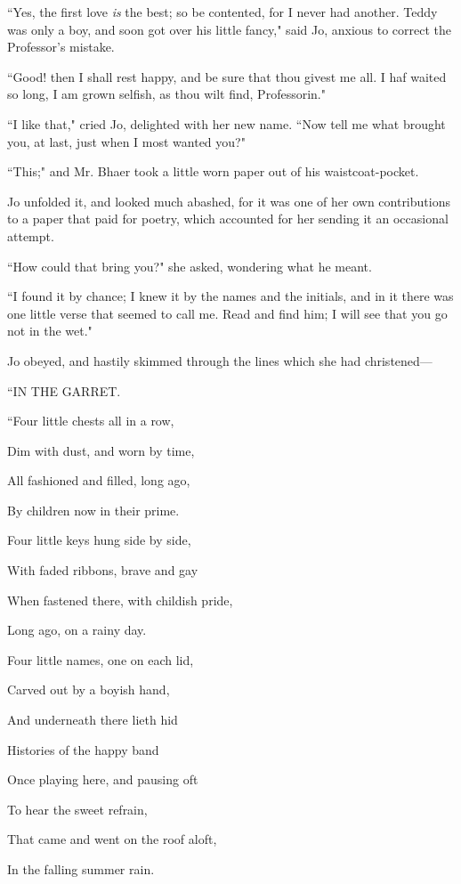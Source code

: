 ``Yes, the first love \emph{is} the best; so be contented, for I never
had another. Teddy was only a boy, and soon got over his little fancy,"
said Jo, anxious to correct the Professor's mistake.

``Good! then I shall rest happy, and be sure that thou givest me all. I
haf waited so long, I am grown selfish, as thou wilt find, Professorin."

``I like that," cried Jo, delighted with her new name. ``Now tell me what
brought you, at last, just when I most wanted you?"

``This;" and Mr. Bhaer took a little worn paper out of his
waistcoat-pocket.

Jo unfolded it, and looked much abashed, for it was one of her own
contributions to a paper that paid for poetry, which accounted for her
sending it an occasional attempt.

``How could that bring you?" she asked, wondering what he meant.

``I found it by chance; I knew it by the names and the initials, and in
it there was one little verse that seemed to call me. Read and find him;
I will see that you go not in the wet."

Jo obeyed, and hastily skimmed through the lines which she had
christened---

\hfill\break

``IN THE GARRET.

``Four little chests all in a row,

Dim with dust, and worn by time,

All fashioned and filled, long ago,

By children now in their prime.

Four little keys hung side by side,

With faded ribbons, brave and gay

When fastened there, with childish pride,

Long ago, on a rainy day.

Four little names, one on each lid,

Carved out by a boyish hand,

And underneath there lieth hid

Histories of the happy band

Once playing here, and pausing oft

To hear the sweet refrain,

That came and went on the roof aloft,

In the falling summer rain.

